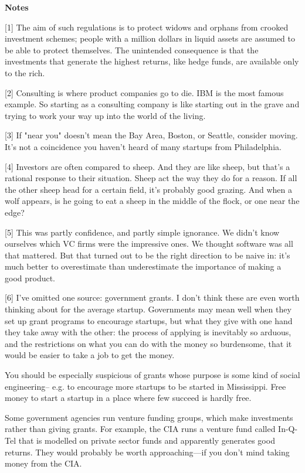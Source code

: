 \textbf{Notes}

[1]
The aim of such regulations is to protect widows and orphans
from crooked investment schemes; people with a million dollars in
liquid assets are assumed to be able to protect themselves.
The unintended consequence is that the investments that generate
the highest returns, like hedge funds, are available only to the
rich.

[2]
Consulting is where product companies go to die.  IBM is the
most famous example.  So starting as a consulting company is like
starting out in the grave and trying to work your way up into the
world of the living.

[3]
If "near you" doesn't mean the Bay Area, Boston, or Seattle,
consider moving.  It's not a coincidence you haven't heard of many
startups from Philadelphia.

[4]
Investors are often compared to sheep.  And they are like sheep,
but that's a rational response to their situation.  Sheep act the
way they do for a reason.  If all the other sheep head for a certain
field, it's probably good grazing.  And when a wolf appears, is he
going to eat a sheep in the middle of the flock, or one near the
edge?

[5]
This was partly confidence, and partly simple ignorance.  We
didn't know ourselves which VC firms were the impressive ones.  We
thought software was all that mattered.  But that turned out to be
the right direction to be naive in: it's much better to overestimate
than underestimate the importance of making a good product.

[6]
I've omitted one source: government grants.  I don't think
these are even worth thinking about for the average startup.
Governments may mean well when they set up grant programs to encourage
startups, but what they give with one hand they take away with the
other: the process of applying is inevitably so arduous, and the
restrictions on what you can do with the money so burdensome, that
it would be easier to take a job to get the money.


You should be especially suspicious of grants whose purpose is some
kind of social engineering-- e.g. to encourage more startups to be
started in Mississippi.  Free money to start a startup in a place
where few succeed is hardly free.

Some government agencies run venture funding groups, which make
investments rather than giving grants.  For example, the CIA runs
a venture fund called In-Q-Tel that is modelled on private sector
funds and apparently generates good returns.  They would probably
be worth approaching---if you don't mind taking money from the CIA.


